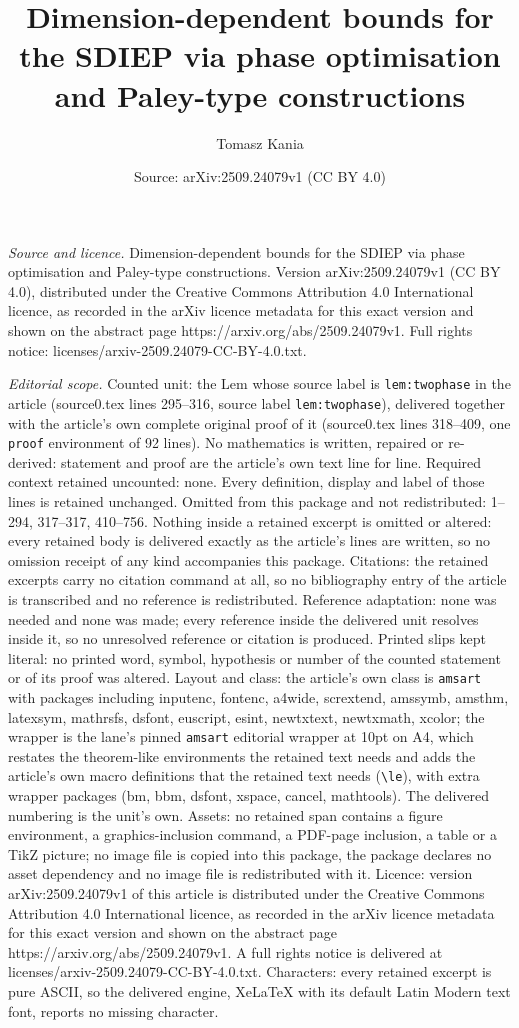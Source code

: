 \documentclass[10pt,a4paper]{amsart}
\title[Dimension-dependent bounds for the SDIEP via phase optimisat]{Dimension-dependent bounds for the SDIEP via phase optimisation and Paley-type constructions}
\author{Tomasz Kania}
\date{Source: arXiv:2509.24079v1 (CC BY 4.0)}
\begin{document}
\maketitle

\noindent\emph{Source and licence.} Dimension-dependent bounds for the SDIEP via phase optimisation and Paley-type constructions. Version arXiv:2509.24079v1 (CC BY 4.0), distributed under the Creative Commons Attribution 4.0 International licence, as recorded in the arXiv licence metadata for this exact version and shown on the abstract page https://arxiv.org/abs/2509.24079v1. Full rights notice: licenses/arxiv-2509.24079-CC-BY-4.0.txt.\par\smallskip

\noindent\textit{Editorial scope.} Counted unit: the Lem whose source label is \texttt{lem:twophase} in the article (source0.tex lines 295--316, source label \texttt{lem:twophase}), delivered together with the article's own complete original proof of it (source0.tex lines 318--409, one \texttt{proof} environment of 92 lines). No mathematics is written, repaired or re-derived: statement and proof are the article's own text line for line. Required context retained uncounted: none. Every definition, display and label of those lines is retained unchanged. Omitted from this package and not redistributed: 1--294, 317--317, 410--756. Nothing inside a retained excerpt is omitted or altered: every retained body is delivered exactly as the article's lines are written, so no omission receipt of any kind accompanies this package. Citations: the retained excerpts carry no citation command at all, so no bibliography entry of the article is transcribed and no reference is redistributed. Reference adaptation: none was needed and none was made; every reference inside the delivered unit resolves inside it, so no unresolved reference or citation is produced. Printed slips kept literal: no printed word, symbol, hypothesis or number of the counted statement or of its proof was altered. Layout and class: the article's own class is \texttt{amsart} with packages including inputenc, fontenc, a4wide, scrextend, amssymb, amsthm, latexsym, mathrsfs, dsfont, euscript, esint, newtxtext, newtxmath, xcolor; the wrapper is the lane's pinned \texttt{amsart} editorial wrapper at 10pt on A4, which restates the theorem-like environments the retained text needs and adds the article's own macro definitions that the retained text needs (\texttt{\textbackslash le}), with extra wrapper packages (bm, bbm, dsfont, xspace, cancel, mathtools). The delivered numbering is the unit's own. Assets: no retained span contains a figure environment, a graphics-inclusion command, a PDF-page inclusion, a table or a TikZ picture; no image file is copied into this package, the package declares no asset dependency and no image file is redistributed with it. Licence: version arXiv:2509.24079v1 of this article is distributed under the Creative Commons Attribution 4.0 International licence, as recorded in the arXiv licence metadata for this exact version and shown on the abstract page https://arxiv.org/abs/2509.24079v1. A full rights notice is delivered at licenses/arxiv-2509.24079-CC-BY-4.0.txt. Characters: every retained excerpt is pure ASCII, so the delivered engine, XeLaTeX with its default Latin Modern text font, reports no missing character.
\end{document}
